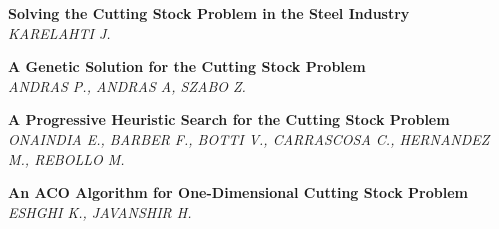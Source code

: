 \documentclass[letterpaper,11pt]{article}
\begin{document}
\begin{thebibliography}{99}
  
  \textbf{Solving the Cutting Stock Problem in the Steel Industry}\\
  \textit{KARELAHTI J.}

  \textbf{A Genetic Solution for the Cutting Stock Problem}\\
  \textit{ANDRAS P., ANDRAS A, SZABO Z.}

  \textbf{A Progressive Heuristic Search for the Cutting Stock Problem}\\
  \textit{ONAINDIA E., BARBER F., BOTTI V., CARRASCOSA C., HERNANDEZ M., REBOLLO M.}

  \textbf{An ACO Algorithm for One-Dimensional Cutting Stock Problem}\\
  \textit{ESHGHI K., JAVANSHIR H.}

  \end{thebibliography}
  
\end{document}
